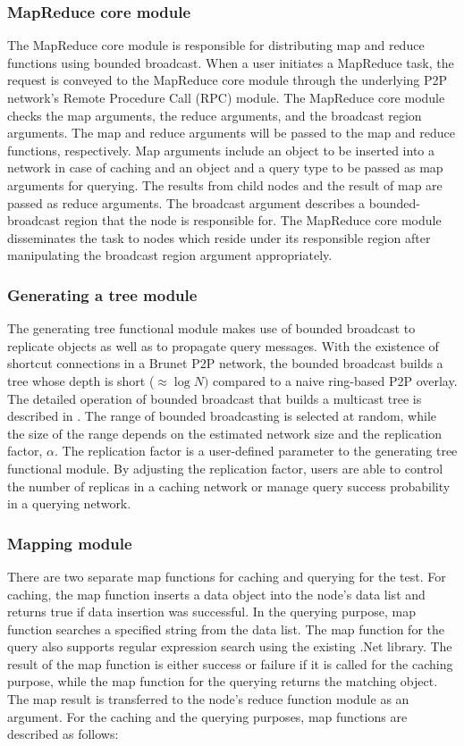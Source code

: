 \documentclass[9.5pt,journal,final,finalsubmission,twocolumn]{IEEEtran}
\begin{document}
\subsubsection{MapReduce core module}
The MapReduce core module is responsible for distributing map and reduce 
functions using bounded broadcast. 
When a user initiates a MapReduce task, the request is conveyed to the 
MapReduce core module through the underlying P2P network's 
Remote Procedure Call (RPC) module. 
The MapReduce core module checks the map arguments, the reduce arguments, 
and the broadcast region arguments. 
The map and reduce arguments will be passed to the map and reduce functions, 
respectively. 
Map arguments include an object to be inserted into a network in case of 
caching and an object and a query type to be passed as map arguments 
for querying.
The results from child nodes and the result of map
are passed as reduce arguments.
The broadcast argument describes a bounded-broadcast region 
that the node is responsible for. 
The MapReduce core module disseminates the task to nodes which reside 
under its responsible region after manipulating the 
broadcast region argument appropriately.

\subsubsection{Generating a tree module}
The generating tree functional module makes use of bounded broadcast to 
replicate objects as well as
to propagate query messages. With the existence of shortcut connections in 
a Brunet P2P network, 
the bounded broadcast builds a tree whose depth is short ($\approx \log{N})$ compared to 
a naive ring-based P2P overlay.
The detailed operation of bounded broadcast that builds a multicast 
tree is described in \cite{to:deetoo10}.
The range of bounded broadcasting is selected at random, while the size of 
the range depends on the estimated network size and the replication factor, 
$\alpha$. The replication factor is a user-defined parameter to the 
generating tree functional module. By adjusting the replication factor,
users are able to control the number of replicas in a caching network or
manage query success probability in a querying network.

\subsubsection{Mapping module}
There are two separate map functions for caching and querying for the test.
For caching, the map function inserts a data object into the node's 
data list
and returns true if data insertion was successful. 
In the querying purpose, map function searches a specified string from 
the data list. The map function for the query also supports 
regular expression search using the existing .Net library.
The result of the map function is either success or failure if it is called for 
the caching purpose, while the map function for the querying returns 
the matching object.
The map result is transferred to the node's reduce function module as an 
argument.
For the caching and the querying purposes, map functions are
described as follows:
\end{document}
